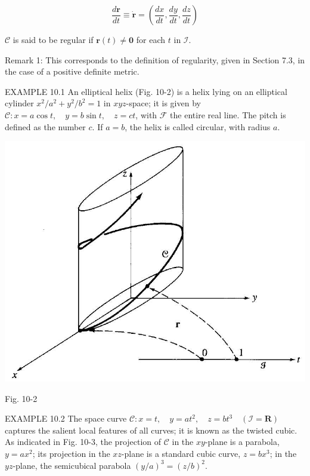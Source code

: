 \documentclass[10pt]{article}
\begin{document}
\begin{equation*}
\frac{d \mathbf{r}}{d t} \equiv \dot{\mathbf{r}}=\left(\frac{d x}{d t}, \frac{d y}{d t}, \frac{d z}{d t}\right) \tag{10.2}
\end{equation*}


$\mathscr{C}$ is said to be regular if $\mathbf{r}(t) \neq \mathbf{0}$ for each $t$ in $\mathscr{I}$.

Remark 1: This corresponds to the definition of regularity, given in Section 7.3, in the case of a positive definite metric.

EXAMPLE 10.1 An elliptical helix (Fig. 10-2) is a helix lying on an elliptical cylinder $x^{2} / a^{2}+y^{2} / b^{2}=1$ in $x y z$-space; it is given by $\mathscr{C}: x=a \cos t, \quad y=b \sin t, \quad z=c t$, with $\mathscr{F}$ the entire real line. The pitch is defined as the number $c$. If $a=b$, the helix is called circular, with radius $a$.

\begin{center}
\includegraphics[max width=\textwidth]{2024_04_03_41f90be4f896e21f0dc9g-137}
\end{center}

Fig. 10-2

EXAMPLE 10.2 The space curve $\mathscr{C}: x=t, \quad y=a t^{2}, \quad z=b t^{3} \quad(\mathscr{I}=\mathbf{R})$ captures the salient local features of all curves; it is known as the twisted cubic. As indicated in Fig. 10-3, the projection of $\mathscr{C}$ in the $x y$-plane is a parabola, $y=a x^{2}$; its projection in the $x z$-plane is a standard cubic curve, $z=b x^{3}$; in the $y z$-plane, the semicubical parabola $(y / a)^{3}=(z / b)^{2}$.
\end{document}
